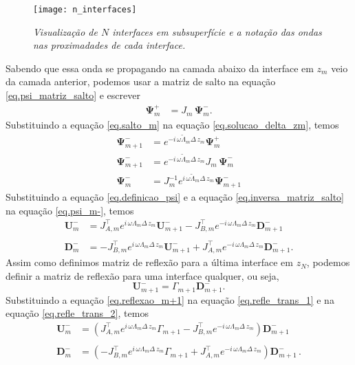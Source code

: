 \begin{figure}
\centering
\texttt{[image: n\_interfaces]}
\caption{\textit{Visualiza\c{c}\~ao de $N$ interfaces em subsuperf\'icie e a nota\c{c}\~ao das ondas nas proximadades de cada interface.}}
\label{fig.N_interfaces}
\end{figure}

Sabendo que essa onda se propagando na camada abaixo da interface em $z_m$ veio da camada anterior, podemos usar a matriz de salto na equa\c{c}\~ao \ref{eq.psi_matriz_salto} e escrever
\begin{align}\label{eq.salto_m}
\mathbf{\Psi}^+_{m}&=J_m\,\mathbf{\Psi}^-_m.
\end{align}
Substituindo a equa\c{c}\~ao \ref{eq.salto_m} na equa\c{c}\~ao \ref{eq.solucao_delta_zm}, temos
\begin{align}\label{eq.psi_m-}\nonumber
\mathbf{\Psi}^-_{m+1}&=e^{-i\,\omega\tilde{\Lambda}_m\Delta\,z_m}\mathbf{\Psi}^+_m\\\nonumber
\mathbf{\Psi}^-_{m+1}&=e^{-i\,\omega\tilde{\Lambda}_m\Delta\,z_m}J_m\,\mathbf{\Psi}^-_m\\
\mathbf{\Psi}^-_m&=J^{-1}_me^{i\,\omega\tilde{\Lambda}_m\Delta\,z_m}\mathbf{\Psi}^-_{m+1}
\end{align}
Substituindo a equa\c{c}\~ao \ref{eq.definicao_psi} e a equa\c{c}\~ao \ref{eq.inversa_matriz_salto} na equa\c{c}\~ao \ref{eq.psi_m-}, temos
\begin{align}\label{eq.refle_trans_1}
\mathbf{U}_m^-&=J^\top_{A,m}e^{i\,\omega\Lambda_m\Delta\,z_m}\mathbf{U}^-_{m+1}-J^\top_{B,m}e^{-i\,\omega\Lambda_m\Delta\,z_m}\mathbf{D}^-_{m+1}\\\nonumber\\\label{eq.refle_trans_2}
\mathbf{D}_m^-&=-J^\top_{B,m}e^{i\,\omega\Lambda_m\Delta\,z_m}\mathbf{U}^-_{m+1}+J^\top_{A,m}e^{-i\,\omega\Lambda_m\Delta\,z_m}\mathbf{D}^-_{m+1}.
\end{align}
Assim como definimos matriz de reflex\~ao para a \'ultima interface em $z_N$, podemos definir a matriz de reflex\~ao para uma interface qualquer, ou seja,
\begin{equation}\label{eq.reflexao_m+1}
\mathbf{U}^-_{m+1}=\Gamma_{m+1}\mathbf{D}^-_{m+1}.
\end{equation}
Substituindo a equa\c{c}\~ao \ref{eq.reflexao_m+1} na equa\c{c}\~ao \ref{eq.refle_trans_1} e na equa\c{c}\~ao \ref{eq.refle_trans_2}, temos
\begin{align}\label{eq.refle_trans_3}
\mathbf{U}_m^-&=(J^\top_{A,m}e^{i\,\omega\Lambda_m\Delta\,z_m}\Gamma_{m+1}-J^\top_{B,m}e^{-i\,\omega\Lambda_m\Delta\,z_m})\mathbf{D}^-_{m+1}\\\nonumber\\\label{eq.refle_trans_4}
\mathbf{D}_m^-&=(-J^\top_{B,m}e^{i\,\omega\Lambda_m\Delta\,z_m}\Gamma_{m+1}+J^\top_{A,m}e^{-i\,\omega\Lambda_m\Delta\,z_m})\mathbf{D}^-_{m+1}\,.
\end{align}
